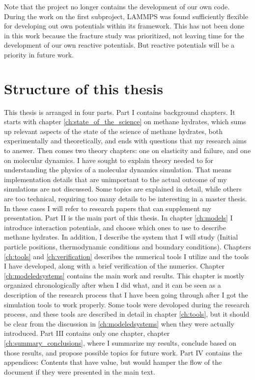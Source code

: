 Note that the project no longer contains the development of our own code. During the work on the first subproject, LAMMPS was found sufficiently flexible for developing out own potentials within its framework. This has not been done in this work because the fracture study was prioritized, not leaving time for the development of our own reactive potentials. But reactive potentials will be a priority in future work.

\section{Structure of this thesis}

This thesis is arranged in four parts. Part I contains background chapters. It starts with chapter \ref{ch:state_of_the_science} on methane hydrates, which sums up relevant aspects of the state of the science of methane hydrates, both experimentally and theoretically, and ends with questions that my research aims to answer. Then comes two theory chapters: one on elasticity and failure, and one on molecular dynamics. I have sought to explain theory needed to for understanding the physics of a molecular dynamics simulation. That means implementation details that are unimportant to the actual outcome of my simulations are not discussed. Some topics are explained in detail, while others are too technical, requiring too many details to be interesting in a master thesis. In these cases I will refer to research papers that can supplement my presentation. Part II is the main part of this thesis. In chapter \ref{ch:models} I introduce interaction potentials, and choose which ones to use to describe methane hydrates. In addition, I describe the system that I will study (Initial particle positions, thermodynamic conditions and boundary conditions). Chapters \ref{ch:tools} and \ref{ch:verification} describes the numerical tools I utilize and the tools I have developed, along with a brief verification of the numerics. Chapter \ref{ch:modeledsystems} contains the main work and results. This chapter is mostly organized chronologically after when I did what, and it can be seen as a description of the research process that I have been going through after I got the simulation tools to work properly. Some tools were devoloped during the research process, and these tools are described in detail in chapter \ref{ch:tools}, but it should be clear from the discussion in \ref{ch:modeledsystems} when they were actually introduced. Part III contains only one chapter, chapter \ref{ch:summary_conclusions}, where I summarize my results, conclude based on those results, and propose possible topics for future work. Part IV contains the appendices: Contents that have value, but would hamper the flow of the document if they were presented in the main text.


